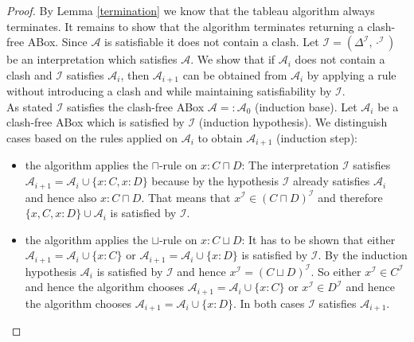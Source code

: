 \documentclass{book}
\theoremstyle{break}
\theoremstyle{definition}
\begin{document}
\begin{proof}
By Lemma \ref{termination} we know that the tableau algorithm always terminates. It remains to show that the algorithm terminates returning a clash-free ABox. Since $\mathcal{A}$ is satisfiable it does not contain a clash. Let $\mathcal{I}=(\Delta^\mathcal{I},\cdot^\mathcal{I})$ be an interpretation which satisfies $\mathcal{A}$. We show that if $\mathcal{A}_i$ does not contain a clash and $\mathcal{I}$ satisfies $\mathcal{A}_i$, then $\mathcal{A}_{i+1}$ can be obtained from $\mathcal{A}_i$ by applying a rule without introducing a clash and while maintaining satisfiability by $\mathcal{I}$.\\
As stated $\mathcal{I}$ satisfies the clash-free ABox $\mathcal{A}=:\mathcal{A}_{0}$ (induction base).
Let $\mathcal{A}_i$ be a clash-free ABox which is satisfied by $\mathcal{I}$ (induction hypothesis).
We distinguish cases based on the rules applied on $\mathcal{A}_i$ to obtain $\mathcal{A}_{i+1}$ (induction step):
\begin{itemize}
\item the algorithm applies the $\sqcap$-rule on $x:C\sqcap D$: The interpretation $\mathcal{I}$ satisfies $\mathcal{A}_{i+1}=\mathcal{A}_i\cup\{x:C,x:D\}$ because by the hypothesis $\mathcal{I}$ already satisfies $\mathcal{A}_i$ and hence also $x:C\sqcap D$. That means that $x^\mathcal{I}\in(C\sqcap D)^\mathcal{I}$ and therefore $\{x,C,x:D\}\cup\mathcal{A}_i$ is satisfied by $\mathcal{I}$.
\item the algorithm applies the $\sqcup$-rule on $x:C\sqcup D$: It has to be shown that either $\mathcal{A}_{i+1}=\mathcal{A}_i\cup\{x:C\}$ or $\mathcal{A}_{i+1}=\mathcal{A}_i\cup\{x:D\}$ is satisfied by $\mathcal{I}$. By the induction hypothesis $\mathcal{A}_i$ is satisfied by $\mathcal{I}$ and hence $x^\mathcal{I}=(C\sqcup D)^\mathcal{I}$. So either $x^\mathcal{I}\in C^\mathcal{I}$ and hence the algorithm chooses $\mathcal{A}_{i+1}=\mathcal{A}_i\cup\{x:C\}$ or $x^\mathcal{I}\in D^\mathcal{I}$ and hence the algorithm chooses $\mathcal{A}_{i+1}=\mathcal{A}_i\cup\{x:D\}$. In both cases $\mathcal{I}$ satisfies $\mathcal{A}_{i+1}$.

\end{itemize}
\end{proof}
\end{document}
